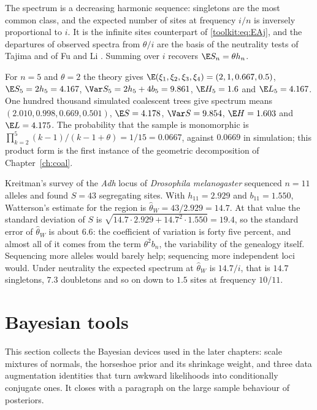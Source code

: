 The spectrum is a decreasing harmonic sequence: singletons are the most common class, and the
expected number of sites at frequency $i/n$ is inversely proportional to $i$. It is the infinite
sites counterpart of \eqref{toolkit:eq:EAj}, and the departures of observed spectra from $\theta/i$
are the basis of the neutrality tests of Tajima and of Fu and Li \citep{toolkit:fu1995}. Summing
over $i$ recovers $\E S_n=\theta h_n$.

\begin{example}\label{toolkit:ex:sfs}
For $n=5$ and $\theta=2$ the theory gives $\E(\xi_1,\xi_2,\xi_3,\xi_4)=(2,1,0.667,0.5)$,
$\E S_5=2h_5=4.167$, $\Var S_5=2h_5+4b_5=9.861$, $\E H_5=1.6$ and $\E L_5=4.167$. One hundred
thousand simulated coalescent trees give spectrum means $(2.010,0.998,0.669,0.501)$, $\E S=4.178$,
$\Var S=9.854$, $\E H=1.603$ and $\E L=4.175$. The probability that the sample is monomorphic is
$\prod_{k=2}^5(k-1)/(k-1+\theta)=1/15=0.0667$, against $0.0669$ in simulation; this product form
is the first instance of the geometric decomposition of Chapter~\ref{ch:coal}.
\end{example}

\begin{example}\label{toolkit:ex:kreitman}
Kreitman's survey of the \emph{Adh} locus of \emph{Drosophila melanogaster}
\citep{toolkit:kreitman1983} sequenced $n=11$ alleles and found $S=43$ segregating sites. With
$h_{11}=2.929$ and $b_{11}=1.550$, Watterson's estimate for the region is
$\hat\theta_W=43/2.929=14.7$. At that value the standard deviation of $S$ is
$\sqrt{14.7\cdot2.929+14.7^2\cdot1.550}=19.4$, so the standard error of $\hat\theta_W$ is about
$6.6$: the coefficient of variation is forty five percent, and almost all of it comes from the
term $\theta^2b_n$, the variability of the genealogy itself. Sequencing more alleles would barely
help; sequencing more independent loci would. Under neutrality the expected spectrum at
$\hat\theta_W$ is $14.7/i$, that is $14.7$ singletons, $7.3$ doubletons and so on down to $1.5$
sites at frequency $10/11$.
\end{example}

\section{Bayesian tools}\label{toolkit:sec:bayes}

This section collects the Bayesian devices used in the later chapters: scale mixtures of normals,
the horseshoe prior and its shrinkage weight, and three data augmentation identities that turn
awkward likelihoods into conditionally conjugate ones. It closes with a paragraph on the large
sample behaviour of posteriors.

